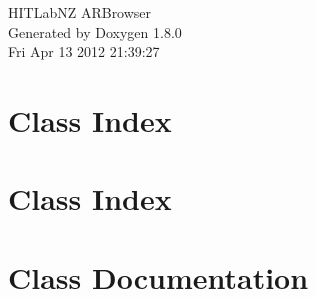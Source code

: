 \documentclass{book}
\begin{document}
\hypersetup{pageanchor=false,citecolor=blue}
\begin{titlepage}
\vspace*{7cm}
\begin{center}
{\Large H\-I\-T\-Lab\-N\-Z A\-R\-Browser }\\
\vspace*{1cm}
{\large Generated by Doxygen 1.8.0}\\
\vspace*{0.5cm}
{\small Fri Apr 13 2012 21:39:27}\\
\end{center}
\end{titlepage}
\clearemptydoublepage
{}
\tableofcontents
\clearemptydoublepage
{}
\hypersetup{pageanchor=true,citecolor=blue}
\chapter{Class Index}

\chapter{Class Index}

\chapter{Class Documentation}















\printindex
\end{document}
